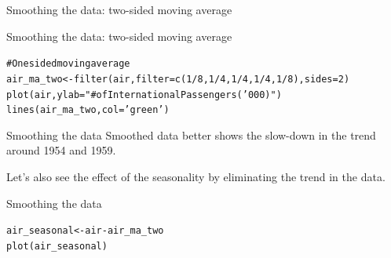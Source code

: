 \documentclass{beamer}\usepackage[]{graphicx}\usepackage[]{color}
\makeatletter
\newcommand{\hlnum}[1]{\textcolor[rgb]{0.824,0.412,0.118}{#1}}%
\newcommand{\hlstr}[1]{\textcolor[rgb]{1,0.894,0.71}{#1}}%
\newcommand{\hlcom}[1]{\textcolor[rgb]{0.824,0.706,0.549}{#1}}%
\newcommand{\hlopt}[1]{\textcolor[rgb]{1,0.894,0.769}{#1}}%
\newcommand{\hlstd}[1]{\textcolor[rgb]{1,0.894,0.769}{#1}}%
\newcommand{\hlkwb}[1]{\textcolor[rgb]{0.804,0.776,0.451}{#1}}%
\newcommand{\hlkwc}[1]{\textcolor[rgb]{0.78,0.941,0.545}{#1}}%
\newcommand{\hlkwd}[1]{\textcolor[rgb]{1,0.78,0.769}{#1}}%
\newenvironment{kframe}{%
 \def\at@end@of@kframe{}%
 \ifinner\ifhmode%
  \def\at@end@of@kframe{\end{minipage}}%
  \begin{minipage}{\columnwidth}%
 \fi\fi%
 \def\FrameCommand##1{\hskip\@totalleftmargin \hskip-\fboxsep
 \colorbox{shadecolor}{##1}\hskip-\fboxsep
     \hskip-\linewidth \hskip-\@totalleftmargin \hskip\columnwidth}%
 \MakeFramed {\advance\hsize-\width
   \@totalleftmargin\z@ \linewidth\hsize
   \@setminipage}}%
 {\par\unskip\endMakeFramed%
 \at@end@of@kframe}
\newenvironment{knitrout}{}{} %
\makeatother
\begin{document}
\begin{darkframes}
\begin{frame}[fragile]{Smoothing the data: two-sided moving average}
    \end{frame}  
    
    
    \begin{frame}[fragile]{Smoothing the data: two-sided moving average}
      \fontsize{8}{8}\selectfont
  
\begin{knitrout}
\begin{kframe}
\begin{alltt}
\hlcom{# One sided moving average}
\hlstd{air_ma_two} \hlkwb{<-} \hlkwd{filter}\hlstd{(air,} \hlkwc{filter}\hlstd{=}\hlkwd{c}\hlstd{(}\hlnum{1}\hlopt{/}\hlnum{8}\hlstd{,}\hlnum{1}\hlopt{/}\hlnum{4}\hlstd{,}\hlnum{1}\hlopt{/}\hlnum{4}\hlstd{,}\hlnum{1}\hlopt{/}\hlnum{4}\hlstd{,}\hlnum{1}\hlopt{/}\hlnum{8}\hlstd{),} \hlkwc{sides}\hlstd{=}\hlnum{2}\hlstd{)}
\hlkwd{plot}\hlstd{(air,} \hlkwc{ylab}\hlstd{=}\hlstr{"# of International Passengers ('000)"}\hlstd{)}
\hlkwd{lines}\hlstd{(air_ma_two,} \hlkwc{col}\hlstd{=}\hlstr{'green'}\hlstd{)}
\end{alltt}
\end{kframe}


\end{knitrout}
    
    \end{frame}
    
    
    \begin{frame}[fragile]{Smoothing the data}
      \fontsize{9}{9}\selectfont
      Smoothed data better shows the slow-down in the trend around 1954 and 1959.
      \bigskip
      
      Let's also see the effect of the seasonality by eliminating the trend in the data.

    \end{frame}
    
    
    
    \begin{frame}[fragile]{Smoothing the data}
      \fontsize{9}{9}\selectfont
     
\begin{knitrout}
\begin{kframe}
\begin{alltt}
      \hlstd{air_seasonal} \hlkwb{<-} \hlstd{air} \hlopt{-} \hlstd{air_ma_two}
      \hlkwd{plot}\hlstd{(air_seasonal)}
\end{alltt}
\end{kframe}



\end{knitrout}
\end{frame}
\end{darkframes}
\end{document}
